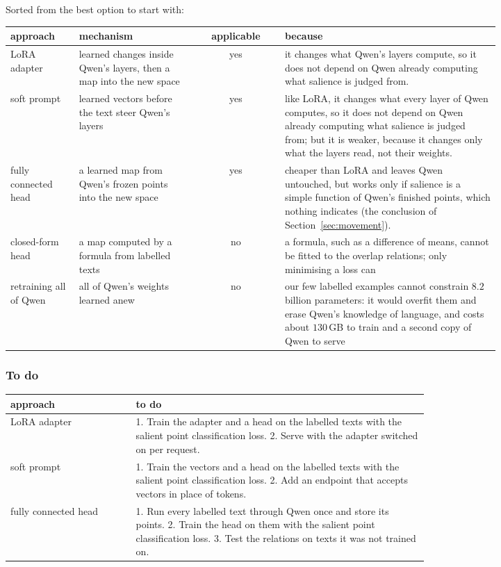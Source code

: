 \documentclass[11pt]{article}
\theoremstyle{remark}
\begin{document}
Sorted from the best option to start with:
\begin{center}
\small
\begin{tabular}{@{}p{0.14\linewidth} p{0.24\linewidth} c p{0.44\linewidth}@{}}
\hline
approach & mechanism & applicable & because \\
\hline
LoRA adapter & learned changes inside Qwen's layers, then a map into the new space & yes & it changes what Qwen's layers compute, so it does not depend on Qwen already computing what salience is judged from. \\
soft prompt & learned vectors before the text steer Qwen's layers & yes & like LoRA, it changes what every layer of Qwen computes, so it does not depend on Qwen already computing what salience is judged from; but it is weaker, because it changes only what the layers read, not their weights. \\
fully connected head & a learned map from Qwen's frozen points into the new space & yes & cheaper than LoRA and leaves Qwen untouched, but works only if salience is a simple function of Qwen's finished points, which nothing indicates (the conclusion of Section~\ref{sec:movement}). \\
closed-form head & a map computed by a formula from labelled texts & no & a formula, such as a difference of means, cannot be fitted to the overlap relations; only minimising a loss can \\
retraining all of Qwen & all of Qwen's weights learned anew & no & our few labelled examples cannot constrain $8.2$ billion parameters: it would overfit them and erase Qwen's knowledge of language, and costs about $130$\,GB to train and a second copy of Qwen to serve \\
\hline
\end{tabular}
\end{center}

\subsubsection{To do}

\begin{center}
\small
\begin{tabular}{@{}l p{0.7\linewidth}@{}}
\hline
approach & to do \\
\hline
LoRA adapter & 1. Train the adapter and a head on the labelled texts with the salient point classification loss. 2. Serve with the adapter switched on per request. \\
soft prompt & 1. Train the vectors and a head on the labelled texts with the salient point classification loss. 2. Add an endpoint that accepts vectors in place of tokens. \\
fully connected head & 1. Run every labelled text through Qwen once and store its points. 2. Train the head on them with the salient point classification loss. 3. Test the relations on texts it was not trained on. \\
\hline
\end{tabular}
\end{center}
\end{document}
